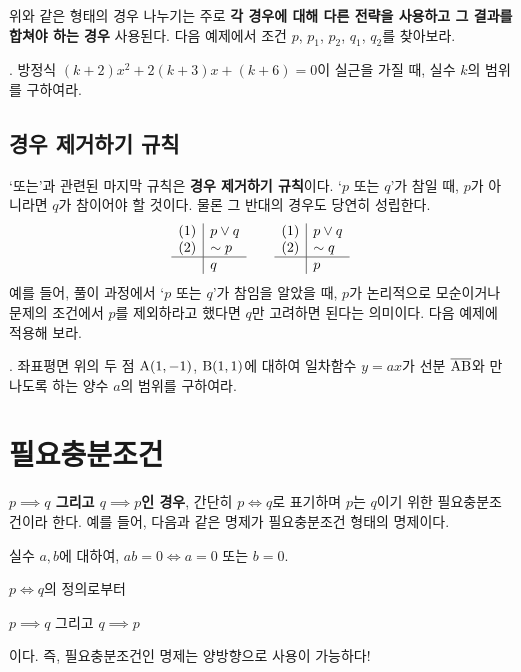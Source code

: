 위와 같은 형태의 경우 나누기는 주로 \textbf{각 경우에 대해 다른 전략을 사용하고 그 결과를 합쳐야 하는 경우} 사용된다. 다음 예제에서 조건 \(p\), \(p_1\), \(p_2\), \(q_1\), \(q_2\)를 찾아보라.

\bigskip

\ex. 방정식 \((k + 2)x^2 + 2(k + 3)x + (k + 6) = 0\)이 실근을 가질 때, 실수 \(k\)의 범위를 구하여라.

\pagebreak

\subsection{경우 제거하기 규칙}

`또는'과 관련된 마지막 규칙은 \textbf{경우 제거하기 규칙}이다. `\(p\) 또는 \(q\)'가 참일 때, \(p\)가 아니라면 \(q\)가 참이어야 할 것이다. 물론 그 반대의 경우도 당연히 성립한다.
\[
    \begin{array}{c|l}
        (1) & p \vee q \\ (2) & \sim p \\\hline & q
    \end{array}
    \qquad
    \begin{array}{c|l}
        (1) & p \vee q \\ (2) & \sim q \\\hline & p
    \end{array}
\]
예를 들어, 풀이 과정에서 `\(p\) 또는 \(q\)'가 참임을 알았을 때, \(p\)가 논리적으로 모순이거나 문제의 조건에서 \(p\)를 제외하라고 했다면 \(q\)만 고려하면 된다는 의미이다. 다음 예제에 적용해 보라.

\bigskip

\ex. 좌표평면 위의 두 점 \(\rm{A}(1, -1)\), \(\rm{B}(1, 1)\)에 대하여 일차함수 \(y = ax\)가 선분 \(\overline{\rm{AB}}\)와 만나도록 하는 양수 \(a\)의 범위를 구하여라.

\pagebreak

\section{필요충분조건}

\textbf{\(p \implies q\) 그리고 \(q \implies p\)인 경우}, 간단히 \(p \iff q\)로 표기하며 \(p\)는 \(q\)이기 위한 필요충분조건이라 한다. 예를 들어, 다음과 같은 명제가 필요충분조건 형태의 명제이다.
\begin{center}
    실수 \(a, b\)에 대하여, \(ab = 0 \iff a = 0\) 또는 \(b = 0\).
\end{center}

\(p \iff q\)의 정의로부터
\begin{center}
    \(p \implies q\) 그리고 \(q \implies p\)
\end{center}
이다. 즉, 필요충분조건인 명제는 양방향으로 사용이 가능하다!

